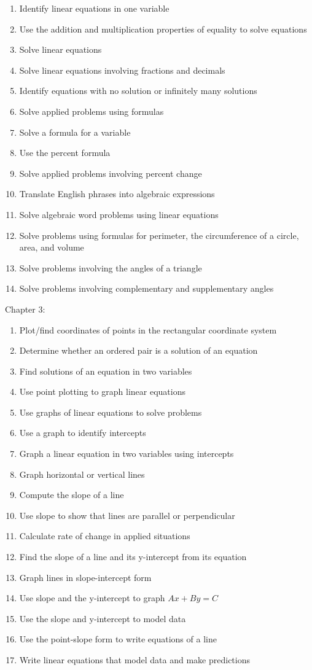 \documentclass[11pt]{article}
\newenvironment{alphalist}{
\begin{enumerate}[label=(\arabic*),widest=107 ,leftmargin=25pt, itemsep=0pt]}
{\end{enumerate}}
\begin{document}
\begin{alphalist}
    \item Identify linear equations in one variable
    \item Use the addition and multiplication properties of equality to solve equations
    \item Solve linear equations
    \item Solve linear equations involving fractions and decimals
    \item Identify equations with no solution or infinitely many solutions
    \item Solve applied problems using formulas
    \item Solve a formula for a variable
    \item Use the percent formula
    \item Solve applied problems involving percent change
    \item Translate English phrases into algebraic expressions
    \item Solve algebraic word problems using linear equations
    \item Solve problems using formulas for perimeter, the circumference of a circle, area, and volume
    \item Solve problems involving the angles of a triangle
    \item Solve problems involving complementary and supplementary angles
\end{alphalist}
\noindent Chapter 3:
 \begin{alphalist}
    \item Plot/find coordinates of points in the rectangular coordinate system
    \item Determine whether an ordered pair is a solution of an equation
    \item Find solutions of an equation in two variables
    \item Use point plotting to graph linear equations
    \item Use graphs of linear equations to solve problems
    \item Use a graph to identify intercepts
    \item Graph a linear equation in two variables using intercepts
    \item Graph horizontal or vertical lines
    \item Compute the slope of a line
    \item Use slope to show that lines are parallel or perpendicular
    \item Calculate rate of change in applied situations
    \item Find the slope of a line and its y-intercept from its equation
    \item Graph lines in slope-intercept form
    \item Use slope and the y-intercept to graph $Ax + By = C$
    \item Use the slope and y-intercept to model data
    \item Use the point-slope form to write equations of a line
    \item Write linear equations that model data and make predictions
 \end{alphalist}
\end{document}
